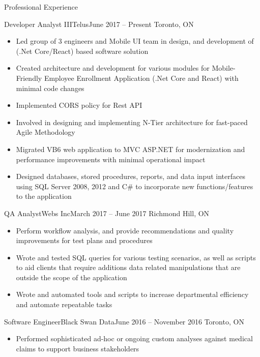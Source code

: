 \documentclass[]{mcdowellcv}
\begin{document}
\makeheader

\begin{cvsection}{Professional Experience}
	\begin{cvsubsection}{Developer Analyst III}{Telus}{June 2017 -- Present}
		Toronto, ON
		\begin{itemize}%
			\item Led group of 3 engineers and Mobile UI team in design, and development of (.Net Core/React) based software solution
			\item Created architecture and development for various modules for Mobile-Friendly Employee Enrollment Application (.Net Core and React) with minimal code changes
			\item Implemented CORS policy for Rest API
			\item Involved in designing and implementing N-Tier architecture for fast-paced Agile Methodology
			\item Migrated VB6 web application to MVC ASP.NET for modernization and performance improvements with minimal operational impact
			\item Designed databases, stored procedures, reports, and data input interfaces using SQL Server 2008, 2012 and C\# to incorporate new functions/features to the application
		\end{itemize}
	\end{cvsubsection}
	\begin{cvsubsection}{QA Analyst}{Webs Inc}{March 2017 -- June 2017}
		Richmond Hill, ON
		\begin{itemize}%
			\item Perform workflow analysis, and provide recommendations and quality improvements for test plans and procedures
			\item Wrote and tested SQL queries for various testing scenarios, as well as scripts to aid clients that require additions data related manipulations that are outside the scope of the application
			\item Wrote and automated tools and scripts to increase departmental efficiency and automate repeatable tasks
		\end{itemize}
	\end{cvsubsection}
	\begin{cvsubsection}{Software Engineer}{Black Swan Data}{June 2016 -- November 2016}
		Toronto, ON
		\begin{itemize}%
			\item Performed sophisticated ad-hoc or ongoing custom analyses against medical claims to support business stakeholders

\end{itemize}
\end{cvsubsection}
\end{cvsection}
\end{document}
